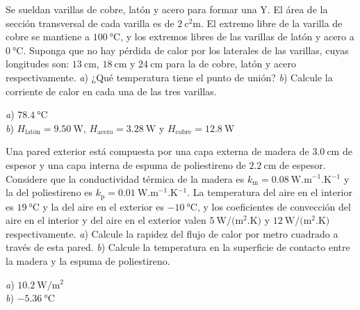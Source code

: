 %
\begin{Exercise}
  Se sueldan varillas de cobre, latón y acero para formar una Y. El área de la sección transversal de cada varilla es de $\SI{2}{\square\centi\metre}$. El extremo libre de la varilla de cobre se mantiene a $\SI{100}{\celsius}$, y los extremos libres de las varillas de latón y acero a $\SI{0}{\celsius}$. Suponga que no hay pérdida de calor por los laterales de las varillas, cuyas longitudes son: $\SI{13}{\centi\metre}$, $\SI{18}{\centi\metre}$ y $\SI{24}{\centi\metre}$ para la de cobre, latón y acero respectivamente. \textit{a}) ¿Qué temperatura tiene el punto de unión? \textit{b}) Calcule la corriente de calor en cada una de las tres varillas.
\end{Exercise}
\begin{Answer}
	\begin{minipage}[t]{.4\textwidth}
    \textit{a}) $\SI{78.4}{\celsius}$\\ \textit{b}) $H_\text{latón} = \SI{9.50}{\watt}$, $H_\text{acero} = \SI{3.28}{\watt}$ y $H_\text{cobre} = \SI{12.8}{\watt}$
  \end{minipage}
\end{Answer}
%
\begin{Exercise}\label{p:transmision01}
  Una pared exterior está compuesta por una capa externa de madera de $\SI{3.0}{\centi\metre}$ de espesor y una capa interna de espuma de poliestireno de $\SI{2.2}{\centi\metre}$ de espesor. Considere que la conductividad térmica de la madera es $k_\text{m} = \SI{0.08}{\watt.\metre^{-1}.\kelvin^{-1}}$ y la del poliestireno es $k_\text{p} = \SI{0.01}{\watt.\metre^{-1}.\kelvin^{-1}}$. La temperatura del aire en el interior es $\SI{19}{\celsius}$ y la del aire en el exterior es $\SI{-10}{\celsius}$, y los coeficientes de convección del aire en el interior y del aire en el exterior valen $\SI{5}{\watt/(\square\metre.\kelvin)}$ y $\SI{12}{\watt/(\square\metre.\kelvin)}$ respectivamente. \textit{a}) Calcule la rapidez del flujo de calor por metro cuadrado a través de esta pared. \textit{b}) Calcule la temperatura en la superficie de contacto entre la madera y la espuma de poliestireno. 
\end{Exercise}
\begin{Answer}
	\begin{minipage}[t]{.4\textwidth}
    \textit{a}) $\SI{10.2}{\watt/\square\metre}$\\ \textit{b}) $\SI{-5.36}{\celsius}$
  \end{minipage}
\end{Answer}
